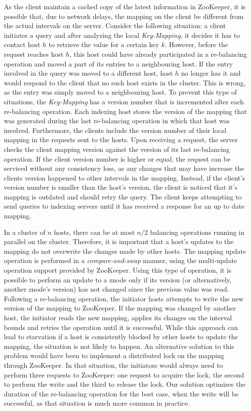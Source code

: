\documentclass[11pt,a4paper]{globis-book}
\begin{document}
As the client maintain a cached copy of the latest information in ZooKeeper, it is possible that, due to network delays, the mapping on the client be different from the actual intervals on the server. Consider the following situation: a client initiates a query and after analyzing the local \textit{Key-Mapping}, it decides it has to contact host $h$ to retrieve the value for a certain key $k$. However, before the request reaches host $h$, this host could have already participated in a re-balancing operation and moved a part of its entries to a neighbouring host. If the entry involved in the query was moved to a different host, host $h$ no longer has it and would respond to the client that no such host exists in the cluster. This is wrong, as the entry was simply moved to a neighbouring host. To prevent this type of situations, the \textit{Key-Mapping} has a version number that is incremented after each re-balancing operation. Each indexing host stores the version of the mapping that was generated during the last re-balancing operation in which that host was involved. Furthermore, the clients include the version number of their local mapping in the requests sent to the hosts. Upon receiving a request, the server checks the client mapping version against the version of its last re-balancing operation. If the client version number is higher or equal, the request can be serviced without any consistency loss, as any changes that may have increase the clients version happened to other intervals in the mapping. Instead, if the client's version number is smaller than the host's version, the client is noticed that it's mapping is outdated and should retry the query. The client keeps attempting to send queries to indexing servers until it has received a response for an up to date mapping. 

In a cluster of $n$ hosts, there can be at most $n/2$ balancing operations running in parallel on the cluster. Therefore, it is important that a host's updates to the mapping do not overwrite the changes made by other hosts. The mapping update operation is performed in a \textit{compare-and-swap} manner, using the multi-update operation support provided by ZooKeeper. Using this type of operation, it is possible to perform an update to a znode only if its version (or alternatively, another znode's version) has not changed since the previous value was read. Following a re-balancing operation, the initiator hosts attempts to write the new version of the mapping to ZooKeeper. If the mapping was changed by another host, the initiator reads the new mapping, applies its changes on the interval bounds and retries the operation until it is successful. While this approach can lead to starvation if a host is consistently blocked by other hosts to update the mapping, the situation is not likely to happen. An alternative solution to this problem would have been to implement a distributed lock on the mapping through ZooKeeper. In that situation, the initiators would always need to perform three requests to ZooKeeper: one request to acquire the lock, the second to perform the write and the third to release the lock. Our solution optimizes the duration of the re-balancing operation for the best case, when the write will be successful, as that situation is much more common in practice. 
\end{document}
